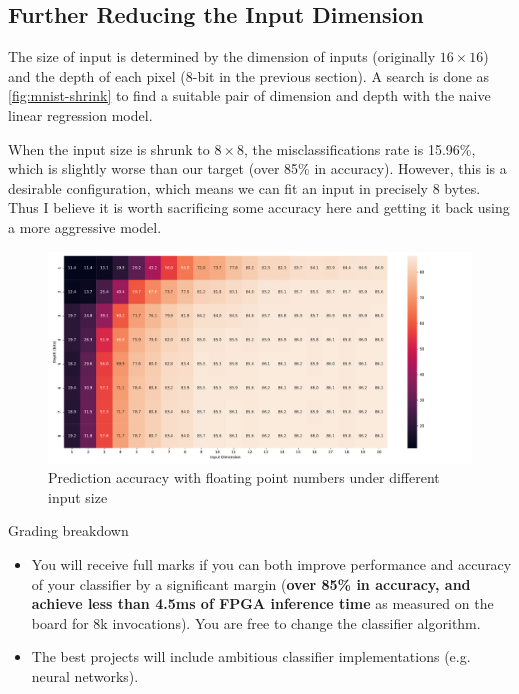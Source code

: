 \subsection{Further Reducing the Input Dimension}

The size of input is determined by the dimension of inputs (originally \(16 \times 16\)) and the depth of each pixel (8-bit in the previous section).
A search is done as \autoref{fig:mnist-shrink} to find a suitable pair of dimension and depth with the naive linear regression model.


When the input size is shrunk to \(8 \times 8\), the misclassifications rate is 15.96\%, which is slightly worse than our target (over 85\% in accuracy).
However, this is a desirable configuration, which means we can fit an input in precisely 8 bytes.
Thus I believe it is worth sacrificing some accuracy here and getting it back using a more aggressive model.

\begin{figure}[ht!]
    \centering
    \includegraphics[width=\textwidth]{images/mnist-shrink.pdf}
    \caption{Prediction accuracy with floating point numbers under different input size}
    \label{fig:mnist-shrink}
\end{figure}


Grading breakdown

\begin{itemize}
    \item You will receive full marks if you can both improve performance and accuracy of your classifier by a significant margin (\textbf{over 85\% in accuracy, and achieve less than 4.5ms of FPGA inference time} as measured on the board for 8k invocations). You are free to change the classifier algorithm.
    \item The best projects will include ambitious classifier implementations (e.g. neural networks).
\end{itemize}

